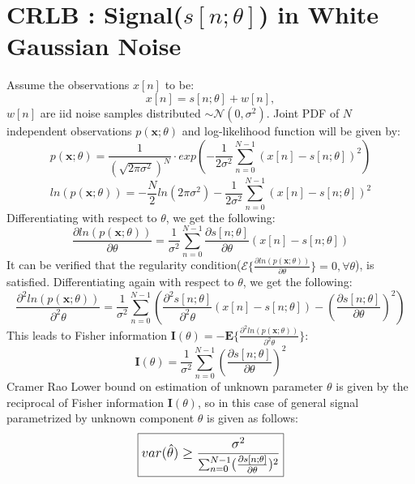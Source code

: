 \documentclass{article}
\begin{document}
\section{CRLB : Signal($s[n;\theta]$) in White Gaussian Noise}
Assume the observations $x[n]$ to be:
$$x[n] = s[n;\theta] + w[n],$$
$w[n]$ are iid noise samples distributed $\sim \mathcal{N}(0, \sigma^2)$. Joint PDF of $N$ independent observations $p(\mathbf x; \theta)$ and log-likelihood function will be given by:
$$p(\mathbf x; \theta) = \frac{1}{(\sqrt{2\pi \sigma^2})^N} \cdot exp(-\frac{1}{2\sigma^2}\sum^{N-1}_{n=0}(x[n] - s[n;\theta])^2)$$
$$ln(p(\mathbf x;\theta)) = -\frac{N}{2}ln(2\pi \sigma^2) - \frac{1}{2\sigma^2}\sum^{N-1}_{n=0}(x[n] - s[n;\theta])^2$$
Differentiating with respect to $\theta$, we get the following:
$$\frac{\partial ln(p(\mathbf x; \theta))}{\partial \theta} = \frac{1}{\sigma^2}\sum^{N-1}_{n=0}\frac{\partial s[n;\theta]}{\partial \theta}(x[n] - s[n;\theta])$$
It can be verified that the regularity condition($\mathcal{E}\{ \frac{\partial ln(p(\mathbf x; \theta))}{\partial \theta} \} = 0, \forall \theta$), is satisfied. Differentiating again with respect to $\theta$, we get the following:
$$\frac{\partial ^2 ln(p(\mathbf x; \theta))}{\partial ^2 \theta} = \frac{1}{\sigma^2}\sum^{N-1}_{n=0}(\frac{\partial ^2s[n;\theta]}{\partial ^2\theta}(x[n] - s[n;\theta]) - (\frac{\partial s[n;\theta]}{\partial \theta})^2)$$
This leads to Fisher information $\mathbf I (\theta) = -\mathbf E \{ \frac{\partial ^2ln(p(\mathbf x; \theta))}{\partial ^2\theta} \}$:
$$\mathbf I(\theta) = \frac{1}{\sigma^2}\sum^{N-1}_{n=0}(\frac{\partial s[n;\theta]}{\partial \theta} )^2 $$
Cramer Rao Lower bound on estimation of unknown parameter $\theta$ is given by the reciprocal of Fisher information $\mathbf{I}(\theta)$, so in this case of general signal parametrized by unknown component $\theta$ is given as follows:
\begin{equation} \label{eqA}
\large
\boxed {var(\hat{\theta}) \ge \frac{\sigma^2}{ \sum^{N-1}_{n=0} (\frac{\partial s[n;\theta]}{\partial \theta} )^2}}
\end{equation}

\newpage
\nocite{*}


\end{document}
